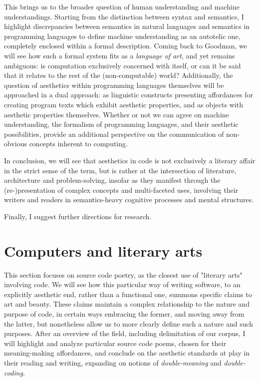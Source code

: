 \documentclass{article}
\begin{document}
This brings us to the broader question of human understanding and machine understandings. Starting from the distinction between syntax and semantics, I highlight discrepancies between semantics in natural languages and semantics in programming languages to define machine understanding as an autotelic one, completely enclosed within a formal description. Coming back to Goodman, we will see how such a formal system fits as a \emph{language of art}, and yet remains ambiguous: is computation exclusively concerned with itself, or can it be said that it relates to the rest of the (non-computable) world? Additionally, the question of aesthetics within programming languages themselves will be approached in a dual approach: as linguistic constructs presenting affordances for creating program texts which exhibit aesthetic properties, and as objects with aesthetic properties themselves. Whether or not we can agree on machine understanding, the formalism of programming languages, and their aesthetic possibilities, provide an additional perspective on the communication of non-obvious concepts inherent to computing.

In conclusion, we will see that aesthetics in code is not exclusively a literary affair in the strict sense of the term, but is rather at the intersection of literature, architecture and problem-solving, insofar as they manifest through the (re-)presentation of complex concepts and multi-faceted uses, involving their writers and readers in semantics-heavy cognitive processes and mental structures.

Finally, I suggest further directions for research.

\section{Computers and literary arts}

This section focuses on source code poetry, as the closest use of "literary arts" involving code. We will see how this particular way of writing software, to an explicitly aesthetic end, rather than a functional one, summons specific claims to art and beauty. These claims maintain a complex relationship to the nature and purpose of code, in certain ways embracing the former, and moving away from the latter, but nonetheless allow us to more clearly define such a nature and such purposes. After an overview of the field, including delimitation of our corpus, I will highlight and analyze particular source code poems, chosen for their meaning-making affordances, and conclude on the aesthetic standards at play in their reading and writing, expanding on notions of \emph{double-meaning} and \emph{double-coding}.
\end{document}
